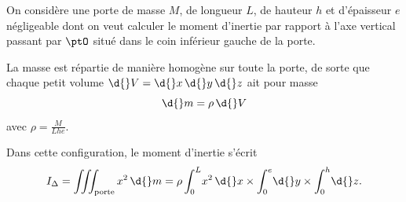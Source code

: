 
\finEntrainement












\hauteurLargeurCadreReponse		{8mm}{7cm}
\typeEntrainement				{} %
\initialisationEntrainement


                                \initialisationPartieGauche %
On considère une porte de masse $M$, de longueur $L$, de hauteur $h$ et d'épaisseur $e$ négligeable 
dont on veut calculer le moment d'inertie par rapport à l'axe vertical passant par $\ptO$ situé 
dans le coin inférieur gauche de la porte. 

La 
masse est répartie de manière homogène sur toute la porte, 
de sorte que chaque petit volume 
$\d{}V=\d{}x\,\d{}y\,\d{}z$
ait pour masse 
\[
\d{}m = \rho\,\d{}V
\]
avec $\rho = \frac{M}{Lhe}$. 

Dans cette configuration, le moment d'inertie s'écrit
\[
	I_\Delta = \iiint_{\text{porte}} x^2\,\d{}m
    = \rho\int_{0}^{L} \! x^2\,\d{}x \times \int_{0}^{e}\! \d{}y \times \int_{0}^{h}\! \d{}z.
\]

